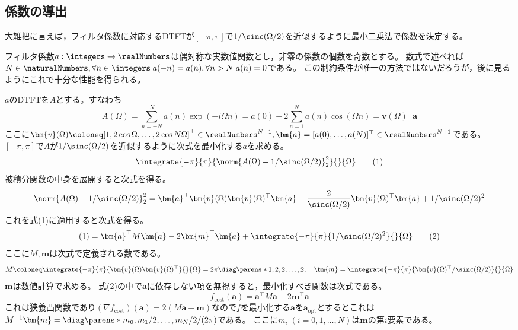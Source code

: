         \subsection{係数の導出}
            大雑把に言えば，フィルタ係数に対応するDTFTが$[-\pi,\pi]$で$1/\sinc(\Omega/2)$を近似するように最小二乗法で係数を決定する。
            \par
            フィルタ係数$a:\integers\to\realNumbers$は偶対称な実数値関数とし，非零の係数の個数を奇数とする。
            数式で述べれば$N\in\naturalNumbers,\forall n\in\integers\;a(-n) = a(n),\forall n>N\;a(n) = 0$である。
            この制約条件が唯一の方法ではないだろうが，後に見るようにこれで十分な性能を得られる。
            \par
            $a$のDTFTを$A$とする。すなわち
            \[ A(\Omega) = \sum_{n=-N}^N a(n)\exp(-i\Omega n) = a(0) + 2\sum_{n=1}^N a(n)\cos(\Omega n) = \bm{v}(\Omega)^\top\bm{a} \]
            ここに$\bm{v}(\Omega) \coloneq [1, 2\cos\Omega,\dots,2\cos N\Omega]^\top\in\realNumbers^{N+1},\bm{a} = [a(0),\dots,a(N)]^\top\in\realNumbers^{N+1}$である。
            $[-\pi,\pi]$で$A$が$1/\sinc(\Omega/2)$を近似するように次式を最小化する$a$を求める。
            \[ \integrate{-\pi}{\pi}{\norm{A(\Omega) - 1/\sinc(\Omega/2)}_2^2}{}{\Omega} \tag{1} \]
            被積分関数の中身を展開すると次式を得る。
            \[ \norm{A(\Omega) - 1/\sinc(\Omega/2)}_2^2 = \bm{a}^\top\bm{v}(\Omega)\bm{v}(\Omega)^\top\bm{a} - \frac{2}{\sinc(\Omega/2)}\bm{v}(\Omega)^\top\bm{a} + 1/\sinc(\Omega/2)^2 \]
            これを式(1)に適用すると次式を得る。
            \[ (1) = \bm{a}^\top M\bm{a} - 2\bm{m}^\top\bm{a} + \integrate{-\pi}{\pi}{1/\sinc(\Omega/2)^2}{}{\Omega} \tag{2} \]
            ここに$M,\bm{m}$は次式で定義される数である。
            \[ M \coloneq \integrate{-\pi}{\pi}{\bm{v}(\Omega)\bm{v}(\Omega)^\top}{}{\Omega} = 2\pi\diag\parens*{1,2,2,\dots,2},\quad \bm{m} = \integrate{-\pi}{\pi}{\bm{v}(\Omega)^\top/\sinc(\Omega/2)}{}{\Omega} \]
            $\bm{m}$は数値計算で求める。
            式(2)の中で$\bm{a}$に依存しない項を無視すると，最小化すべき関数は次式である。
            \[ f_\mathrm{cost}(\bm{a}) = \bm{a}^\top M\bm{a} - 2\bm{m}^\top\bm{a} \]
            これは狭義凸関数であり$(\nabla f_\mathrm{cost})(\bm{a}) = 2(M\bm{a} - \bm{m})$なので$f$を最小化する$\bm{a}$を$\bm{a}_\mathrm{opt}$とするとこれは$M^{-1}\bm{m} = \diag\parens*{m_0,m_1 /2,\dots,m_N /2}/(2\pi)$である。
            ここに$m_i\;(i=0,1,\dots,N)$は$\bm{m}$の第$i$要素である。

